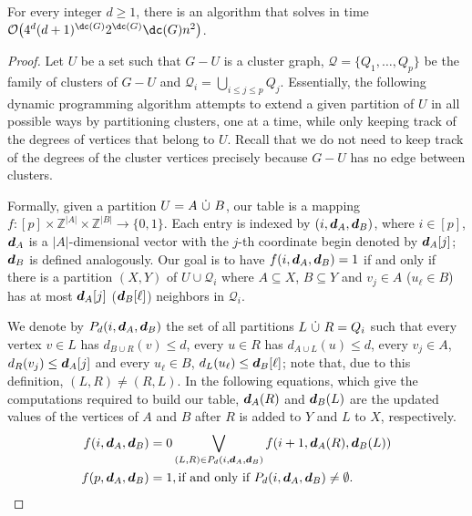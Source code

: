 \begin{theorem}
    \label{thm:fpt_cluster}
    For every integer $d \geq 1$, there is an algorithm that solves  in time $\bigO{4^d(d+1)^{\dc(G)}2^{\dc(G)}\dc(G)n^2}$.
\end{theorem}

\begin{proof}
    
    Let $U$ be a set such that $G - U$ is a cluster graph, $\mathcal{Q} = \{Q_1, \dots, Q_p\}$ be the family of clusters of $G - U$ and $\mathcal{Q}_i = \bigcup_{i \leq j \leq p} Q_j$.
    Essentially, the following dynamic programming algorithm attempts to extend a given partition of $U$ in all possible ways by partitioning clusters, one at a time, while only keeping track of the degrees of vertices that belong to $U$.
    Recall that we do not need to keep track of the degrees of the cluster vertices precisely because $G - U$ has no edge between clusters.

    Formally, given a partition $U = A  \ \dot\cup\  B$, our table is a mapping $f : [p] \times \mathbb{Z}^{|A|} \times \mathbb{Z}^{|B|} \rightarrow \{0, 1\}$.
    Each entry is indexed by $(i, \boldsymbol{d}_A, \boldsymbol{d}_B)$, where $i \in [p]$, $\boldsymbol{d}_A$ is a $|A|$-dimensional vector with the $j$-th coordinate begin denoted by $\boldsymbol{d}_A[j]$; $\boldsymbol{d}_B$ is defined analogously.
    Our goal is to have $f(i, \boldsymbol{d}_A, \boldsymbol{d}_B) = 1$ if and only if there is a partition $(X, Y)$ of $U \cup \mathcal{Q}_i$ where $A \subseteq X$, $B \subseteq Y$ and $v_j \in A$ ($u_{\ell} \in B$) has at most $\boldsymbol{d}_A[j]$ ($\boldsymbol{d}_B[\ell]$) neighbors in $\mathcal{Q}_i$.

    We denote by $P_d(i, \boldsymbol{d}_A, \boldsymbol{d}_B)$ the set of all partitions $L  \ \dot\cup\  R = Q_i$ such that every vertex $v \in L$ has $d_{B \cup R}(v) \leq d$, every $u \in R$ has $d_{A \cup L}(u) \leq d$, every $v_j \in A$, $d_R(v_j) \leq \boldsymbol{d}_A[j]$ and every $u_{\ell} \in B$, $d_L(u_{\ell}) \leq \boldsymbol{d}_B[\ell]$; note that, due to this definition, $(L, R) \neq (R, L)$.
    In the following equations, which give the computations required to build our table, $\boldsymbol{d}_A(R)$ and $\boldsymbol{d}_B(L)$ are the updated values of the vertices of $A$ and $B$ after $R$ is added to $Y$ and $L$ to $X$, respectively.
    \begin{align}
        f(i, \boldsymbol{d}_A, \boldsymbol{d}_B) &= 0 \bigvee_{(L, R) \in P_d(i, \boldsymbol{d}_A, \boldsymbol{d}_B)} f(i+1,\boldsymbol{d}_A(R), \boldsymbol{d}_B(L))\label{eq:trans_dc}\\
        f(p, \boldsymbol{d}_A, \boldsymbol{d}_B) &= 1, \text{if and only if $P_d(i, \boldsymbol{d}_A, \boldsymbol{d}_B) \neq \emptyset$.}\label{eq:stop_dc}
    \end{align}


\end{proof}
